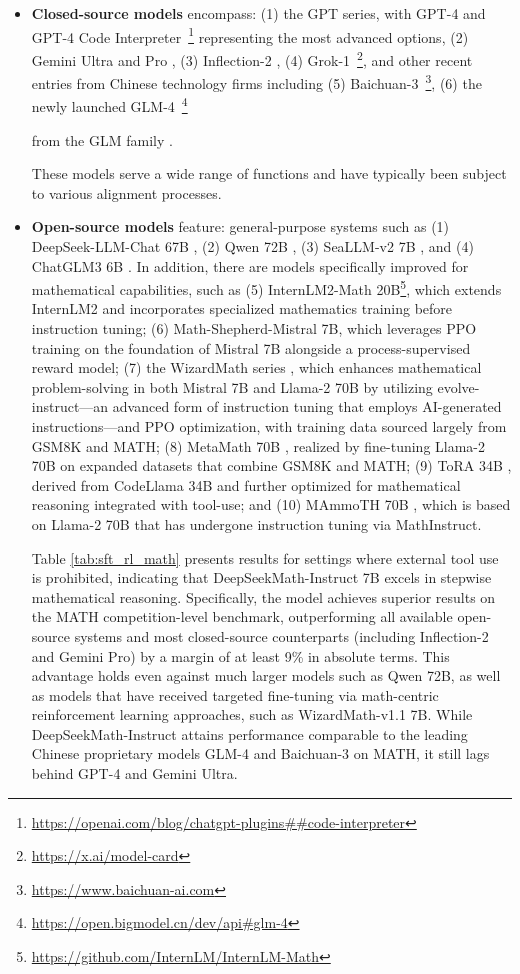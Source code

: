 \begin{itemize}[topsep=0pt]
\begin{itemize}[topsep=0pt]
    \item \textbf{Closed-source models} encompass: (1) the GPT series, with GPT-4 \citep{gpt4} and GPT-4 Code Interpreter~\footnote{\url{https://openai.com/blog/chatgpt-plugins\#\#code-interpreter}} representing the most advanced options, (2) Gemini Ultra and Pro \citep{gemini}, (3) Inflection-2 \citep{inflection-2}, (4) Grok-1~\footnote{\url{https://x.ai/model-card}}, and other recent entries from Chinese technology firms including (5) Baichuan-3~\footnote{\url{https://www.baichuan-ai.com}}, (6) the newly launched GLM-4~\footnote{\url{https://open.bigmodel.cn/dev/api\#glm-4}}

    from the GLM family \citep{glm}.

These models serve a wide range of functions and have typically been subject to various alignment processes.

\item \textbf{Open-source models} feature: general-purpose systems such as (1) DeepSeek-LLM-Chat 67B \citep{deepseek-llm}, (2) Qwen 72B \citep{qwen}, (3) SeaLLM-v2 7B \citep{seallm}, and (4) ChatGLM3 6B \citep{chatglm3}. In addition, there are models specifically improved for mathematical capabilities, such as (5) InternLM2-Math 20B\footnote{\url{https://github.com/InternLM/InternLM-Math}}, which extends InternLM2 and incorporates specialized mathematics training before instruction tuning; (6) Math-Shepherd-Mistral 7B, which leverages PPO training \citep{schulman2017proximal} on the foundation of Mistral 7B \citep{mistral} alongside a process-supervised reward model; (7) the WizardMath series \citep{wizardmath}, which enhances mathematical problem-solving in both Mistral 7B and Llama-2 70B \citep{llama2} by utilizing evolve-instruct—an advanced form of instruction tuning that employs AI-generated instructions—and PPO optimization, with training data sourced largely from GSM8K and MATH; (8) MetaMath 70B \citep{metamath}, realized by fine-tuning Llama-2 70B on expanded datasets that combine GSM8K and MATH; (9) ToRA 34B \cite{tora}, derived from CodeLlama 34B and further optimized for mathematical reasoning integrated with tool-use; and (10) MAmmoTH 70B \citep{MathInstruct}, which is based on Llama-2 70B that has undergone instruction tuning via MathInstruct.

Table \ref{tab:sft_rl_math} presents results for settings where external tool use is prohibited, indicating that DeepSeekMath-Instruct 7B excels in stepwise mathematical reasoning. Specifically, the model achieves superior results on the MATH competition-level benchmark, outperforming all available open-source systems and most closed-source counterparts (including Inflection-2 and Gemini Pro) by a margin of at least 9\% in absolute terms. This advantage holds even against much larger models such as Qwen 72B, as well as models that have received targeted fine-tuning via math-centric reinforcement learning approaches, such as WizardMath-v1.1 7B. While DeepSeekMath-Instruct attains performance comparable to the leading Chinese proprietary models GLM-4 and Baichuan-3 on MATH, it still lags behind GPT-4 and Gemini Ultra.


\end{itemize}
\end{itemize}
